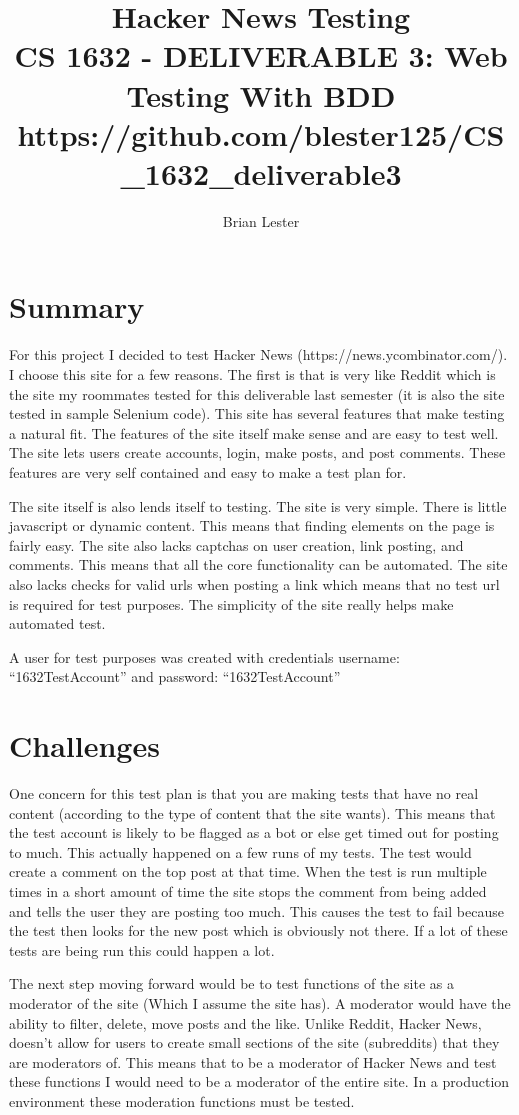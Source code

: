 \documentclass[titlepage]{article}
\title{Hacker News Testing\\
CS 1632 - DELIVERABLE 3: Web Testing With BDD\\
\small{https://github.com/blester125/CS\_1632\_deliverable3}}
\author{Brian Lester}
\begin{document}
\maketitle
\section{Summary}
For this project I decided to test Hacker News (https://news.ycombinator.com/). 
I choose this site for a few reasons. The first is that is very like Reddit which 
is the site my roommates tested for this deliverable last semester (it is also 
the site tested in sample Selenium code). This site has several features that 
make testing a natural fit. The features of the site itself make sense and are 
easy to test well. The site lets users create accounts, login, make posts, and 
post comments. These features are very self contained and easy to make a test 
plan for.

The site itself is also lends itself to testing. The site is very simple. There 
is little javascript or dynamic content. This means that finding elements on the 
page is fairly easy. The site also lacks captchas on user creation, link posting, 
and comments. This means that all the core functionality can be automated. The 
site also lacks checks for valid urls when posting a link which means that no 
test url is required for test purposes. The simplicity of the site really helps 
make automated test. 

A user for test purposes was created with credentials username: 
``1632TestAccount'' and password: ``1632TestAccount''
\section{Challenges}
One concern for this test plan is that you are making tests that have no real 
content (according to the type of content that the site wants). This means that 
the test account is likely to be flagged as a bot or else get timed out for 
posting to much. This actually happened on a few runs of my tests. The test would 
create a comment on the top post at that time. When the test is run multiple 
times in a short amount of time the site stops the comment from being added and 
tells the user they are posting too much. This causes the test to fail because 
the test then looks for the new post which is obviously not there. If a lot of 
these tests are being run this could happen a lot.

The next step moving forward would be to test functions of the site as a 
moderator of the site (Which I assume the site has). A moderator would have the 
ability to filter, delete, move posts and the like. Unlike Reddit, Hacker News, 
doesn't allow for users to create small sections of the site (subreddits) that 
they are moderators of. This means that to be a moderator of Hacker News and test 
these functions I would need to be a moderator of the entire site. In a 
production environment these moderation functions must be tested.  
\end{document}
